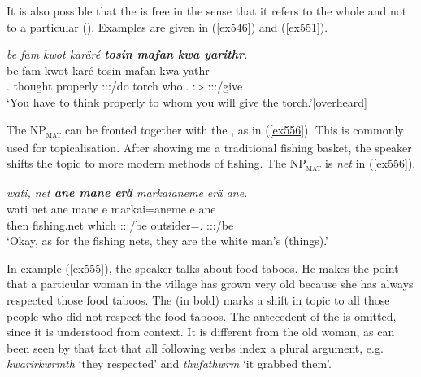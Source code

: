 It is also possible that the  is free in the sense that it refers to the whole  and not to a particular  (\citealt[213]{Andrews:2007relclauses}). Examples are given in (\ref{ex546}) and (\ref{ex551}).

\begin{exe}
	\ex \emph{be fam kwot karäré \textbf{tosin mafan kwa yarithr}.}\\
	\gll be fam kwot karé tosin mafan kwa yathr\\
	\Ssg.{\Erg} thought properly \Ssg:\Sbj:\Imp:\Ipfv/do torch who.\Sg.{\Dat} {\Fut} \Stsg:\Sbj>\Tsg.\Masc:\Io:\Nonpast:\Ipfv/give\\
	\trans `You have to think properly to whom you will give the torch.'{\hspace*{1pt}\hfill{\footnotesize{[overheard]}}}
	\label{ex551}
\end{exe}

The NP\textsubscript{\textsc{mat}} can be fronted together with the , as in (\ref{ex556}). This is commonly used for topicalisation. After showing me a traditional fishing basket, the speaker shifts the topic to more modern methods of fishing. The NP\textsubscript{\textsc{mat}} is \emph{net} in (\ref{ex556}).

\begin{exe}
	\ex \emph{wati, net \textbf{ane mane erä} markaianeme erä ane.}\\
	\gll wati net ane mane e markai=aneme e ane\\
	then {fishing.net} {\Dem} which \Stpl:\Sbj:\Nonpast:\Ipfv/be {outsider}=\Poss.{\Nsg} \Stpl:\Sbj:\Nonpast:\Ipfv/be \Dem\\
	\trans `Okay, as for the fishing nets, they are the white man's (things).'\\
	\label{ex556}
\end{exe}

In example (\ref{ex555}), the speaker talks about food taboos. He makes the point that a particular woman in the village has grown very old because she has always respected those food taboos. The  (in bold) marks a shift in topic to all those people who did not respect the food taboos. The antecedent of the  is omitted, since it is understood from context. It is different from the old woman, as can been seen by that fact that all following verbs index a plural argument, e.g. \emph{kwarirkwrmth} `they respected' and \emph{thufathwrm} `it grabbed them'.

